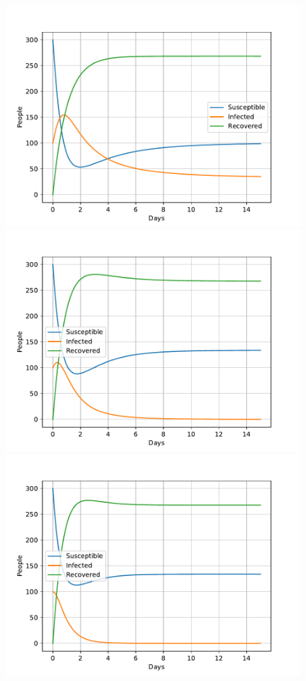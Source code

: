 \documentclass[a4paper]{article}
\begin{document}
\begin{figure}[!htb]
	\centering 
	\includegraphics[scale=0.56]{../plots/opp_e_A0.pdf}
	\includegraphics[scale=0.56]{../plots/opp_e_B0.pdf}	
	\includegraphics[scale=0.56]{../plots/opp_e_C0.pdf}

\end{figure}
\end{document}
